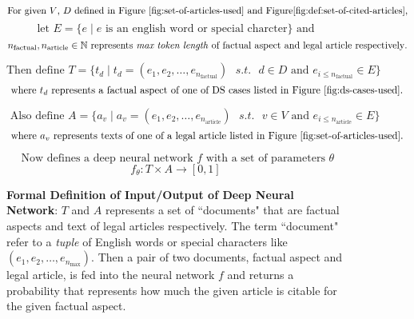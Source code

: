\begin{figure}[ht]
    \[\text{For given $V$, $D$ defined in Figure \ref{fig:set-of-articles-used} and  Figure\ref{fig:def:set-of-cited-articles},}\]
    \[\text{ let } E = \{e \mid e \text{ is an english word or special charcter} \} \text{ and }\]
    \[n_{\text{factual}}, n_{\text{article}} \in \Bbb N \text{ represents \textit{max token length} of factual aspect and legal article respectively}. \]
    
    \[\text{Then define } T = \{t_d \mid t_d = (e_1, e_2, \ldots , e_{n_\text{factual}}) \text{ } s.t. \text{ } d \in D \text{ and } e_{i \le{n_{\text{factual}}}  } \in E \} \]
    \[\text{ where } t_d \text{ represents a factual aspect of one of DS cases listed in Figure \ref{fig:ds-cases-used}. }\]
    
    \[\text{ Also define } A = \{a_v \mid a_v = (e_1, e_2, \ldots , e_{n_\text{article}}) \text{ } s.t. \text{ } v \in V \text{ and } e_{i \le{n_{\text{article}}}  } \in E \}  \]
    \[\text{ where } a_v \text{ represents texts of one of a legal article listed in Figure \ref{fig:set-of-articles-used}. }\]

    \[\text{ Now defines a deep neural network } f \text{ with a set of parameters } \theta \]
    \[f_{\theta}: T \times A \to [0, 1] \]


    \caption{\textbf{Formal Definition of Input/Output of Deep Neural Network}: $T$ and $A$ represents a set of ``documents" that are factual aspects and text of legal articles respectively. The term ``document" refer to a \textit{tuple} of English words or special characters like $(e_1, e_2, \ldots, e_{n_\text{max}})$. Then a pair of two documents, factual aspect and legal article, is fed into the neural network $f$ and returns a probability that represents how much the given article is citable for the given factual aspect.}
    \label{fig:def:io:nn}

\end{figure}